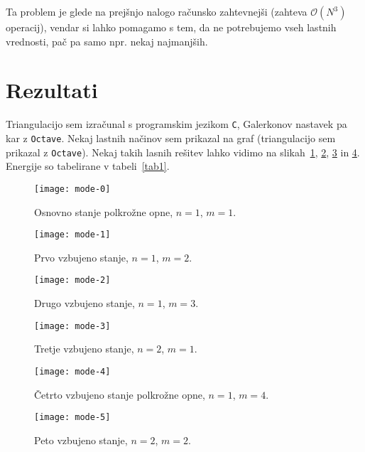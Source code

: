 \documentclass[a4 paper, 12pt]{article}
\begin{document}
Ta problem je glede na prej\v snjo nalogo ra\v cunsko zahtevnej\v si (zahteva $\mathcal{O}(N^3)$
operacij), vendar si lahko pomagamo s tem, da ne potrebujemo vseh lastnih vrednosti, pa\v c pa samo
npr. nekaj najmanj\v sih.

\section{Rezultati}

Triangulacijo sem izra\v cunal s programskim jezikom {\tt C}, Galerkonov nastavek pa kar z {\tt Octave}.
Nekaj lastnih na\v cinov sem prikazal na graf (triangulacijo sem prikazal z {\tt Octave}). Nekaj
takih lasnih re\v sitev lahko vidimo na slikah~\ref{gr1}, \ref{gr2}, \ref{gr3} in \ref{gr4}. Energije so tabelirane v
tabeli~\ref{tab1}.

\begin{figure}[H]\centering
	\texttt{[image: mode-0]}
	\caption{Osnovno stanje polkro\v zne opne, $n = 1$, $m = 1$.}
	\label{gr1}
\end{figure}

\begin{figure}[H]\centering
	\texttt{[image: mode-1]}
	\caption{Prvo vzbujeno stanje, $n = 1$, $m = 2$.}
	\label{gr2}
\end{figure}

\begin{figure}[H]\centering
	\texttt{[image: mode-2]}
	\caption{Drugo vzbujeno stanje, $n = 1$, $m = 3$.}
	\label{gr3}
\end{figure}

\begin{figure}[H]\centering
	\texttt{[image: mode-3]}
	\caption{Tretje vzbujeno stanje, $n = 2$, $m = 1$.}
	\label{gr4}
\end{figure}

\begin{figure}[H]\centering
	\texttt{[image: mode-4]}
	\caption{\v Cetrto vzbujeno stanje polkro\v zne opne, $n = 1$, $m = 4$.}
	\label{gr5}
\end{figure}

\begin{figure}[H]\centering
	\texttt{[image: mode-5]}
	\caption{Peto vzbujeno stanje, $n = 2$, $m = 2$.}
	\label{gr6}
\end{figure}
\end{document}
